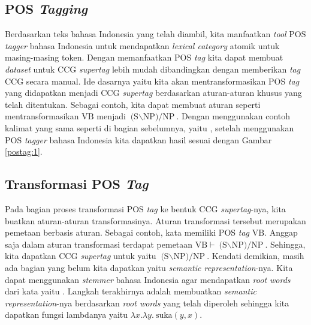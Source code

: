 \subsection{POS \textit{Tagging}}

Berdasarkan teks bahasa Indonesia yang telah diambil, kita manfaatkan \textit{tool} POS \textit{tagger}
bahasa Indonesia untuk mendapatkan \textit{lexical category} atomik untuk masing-masing token.
Dengan memanfaatkan POS \textit{tag} kita dapat membuat \textit{dataset} untuk CCG \textit{supertag}
lebih mudah dibandingkan dengan memberikan \textit{tag} CCG secara manual.
Ide dasarnya yaitu kita akan mentransformasikan POS \textit{tag} yang didapatkan menjadi CCG
\textit{supertag} berdasarkan aturan-aturan khusus yang telah ditentukan.
Sebagai contoh, kita dapat membuat aturan seperti mentransformasikan $\text{VB}$ menjadi
$\text{(S$\backslash$NP)/NP}$.
Dengan menggunakan contoh kalimat yang sama seperti di bagian sebelumnya,
yaitu , setelah menggunakan POS \textit{tagger} bahasa
Indonesia kita dapatkan hasil sesuai dengan Gambar \ref{postag:1}.


\subsection{Transformasi POS \textit{Tag}}

Pada bagian proses transformasi POS \textit{tag} ke bentuk CCG \textit{supertag}-nya,
kita buatkan aturan-aturan transformasinya.
Aturan transformasi tersebut merupakan pemetaan berbasis aturan.
Sebagai contoh, kata  memiliki POS \textit{tag} $\text{VB}$.
Anggap saja dalam aturan transformasi terdapat pemetaan $\text{VB} \vdash \text{(S$\backslash$NP)/NP}$.
Sehingga, kita dapatkan CCG \textit{supertag} untuk  yaitu $\text{(S$\backslash$NP)/NP}$.
Kendati demikian, masih ada bagian yang belum kita dapatkan yaitu \textit{semantic representation}-nya.
Kita dapat menggunakan \textit{stemmer} bahasa Indonesia agar mendapatkan \textit{root words}
dari kata  yaitu .
Langkah terakhirnya adalah membuatkan \textit{semantic representation}-nya berdasarkan
\textit{root words} yang telah diperoleh sehingga kita dapatkan fungsi lambdanya yaitu
$\lambda x.\lambda y.\ \text{suka}(y, x)$.

